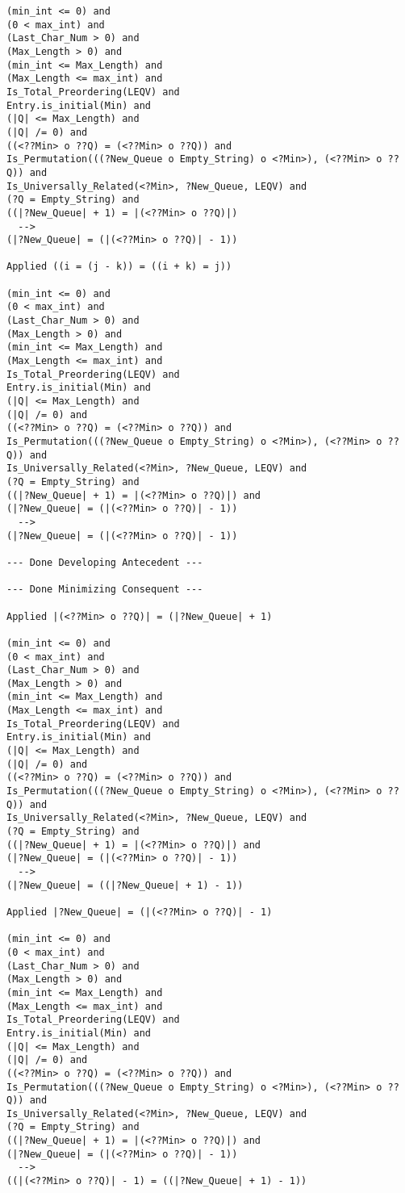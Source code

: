 \begin{lstlisting}[language=resolve]
(min_int <= 0) and
(0 < max_int) and
(Last_Char_Num > 0) and
(Max_Length > 0) and
(min_int <= Max_Length) and
(Max_Length <= max_int) and
Is_Total_Preordering(LEQV) and
Entry.is_initial(Min) and
(|Q| <= Max_Length) and
(|Q| /= 0) and
((<??Min> o ??Q) = (<??Min> o ??Q)) and
Is_Permutation(((?New_Queue o Empty_String) o <?Min>), (<??Min> o ??Q)) and
Is_Universally_Related(<?Min>, ?New_Queue, LEQV) and
(?Q = Empty_String) and
((|?New_Queue| + 1) = |(<??Min> o ??Q)|)
  -->
(|?New_Queue| = (|(<??Min> o ??Q)| - 1))

Applied ((i = (j - k)) = ((i + k) = j))

(min_int <= 0) and
(0 < max_int) and
(Last_Char_Num > 0) and
(Max_Length > 0) and
(min_int <= Max_Length) and
(Max_Length <= max_int) and
Is_Total_Preordering(LEQV) and
Entry.is_initial(Min) and
(|Q| <= Max_Length) and
(|Q| /= 0) and
((<??Min> o ??Q) = (<??Min> o ??Q)) and
Is_Permutation(((?New_Queue o Empty_String) o <?Min>), (<??Min> o ??Q)) and
Is_Universally_Related(<?Min>, ?New_Queue, LEQV) and
(?Q = Empty_String) and
((|?New_Queue| + 1) = |(<??Min> o ??Q)|) and
(|?New_Queue| = (|(<??Min> o ??Q)| - 1))
  -->
(|?New_Queue| = (|(<??Min> o ??Q)| - 1))

--- Done Developing Antecedent ---

--- Done Minimizing Consequent ---

Applied |(<??Min> o ??Q)| = (|?New_Queue| + 1)

(min_int <= 0) and
(0 < max_int) and
(Last_Char_Num > 0) and
(Max_Length > 0) and
(min_int <= Max_Length) and
(Max_Length <= max_int) and
Is_Total_Preordering(LEQV) and
Entry.is_initial(Min) and
(|Q| <= Max_Length) and
(|Q| /= 0) and
((<??Min> o ??Q) = (<??Min> o ??Q)) and
Is_Permutation(((?New_Queue o Empty_String) o <?Min>), (<??Min> o ??Q)) and
Is_Universally_Related(<?Min>, ?New_Queue, LEQV) and
(?Q = Empty_String) and
((|?New_Queue| + 1) = |(<??Min> o ??Q)|) and
(|?New_Queue| = (|(<??Min> o ??Q)| - 1))
  -->
(|?New_Queue| = ((|?New_Queue| + 1) - 1))

Applied |?New_Queue| = (|(<??Min> o ??Q)| - 1)

(min_int <= 0) and
(0 < max_int) and
(Last_Char_Num > 0) and
(Max_Length > 0) and
(min_int <= Max_Length) and
(Max_Length <= max_int) and
Is_Total_Preordering(LEQV) and
Entry.is_initial(Min) and
(|Q| <= Max_Length) and
(|Q| /= 0) and
((<??Min> o ??Q) = (<??Min> o ??Q)) and
Is_Permutation(((?New_Queue o Empty_String) o <?Min>), (<??Min> o ??Q)) and
Is_Universally_Related(<?Min>, ?New_Queue, LEQV) and
(?Q = Empty_String) and
((|?New_Queue| + 1) = |(<??Min> o ??Q)|) and
(|?New_Queue| = (|(<??Min> o ??Q)| - 1))
  -->
((|(<??Min> o ??Q)| - 1) = ((|?New_Queue| + 1) - 1))


\end{lstlisting}
